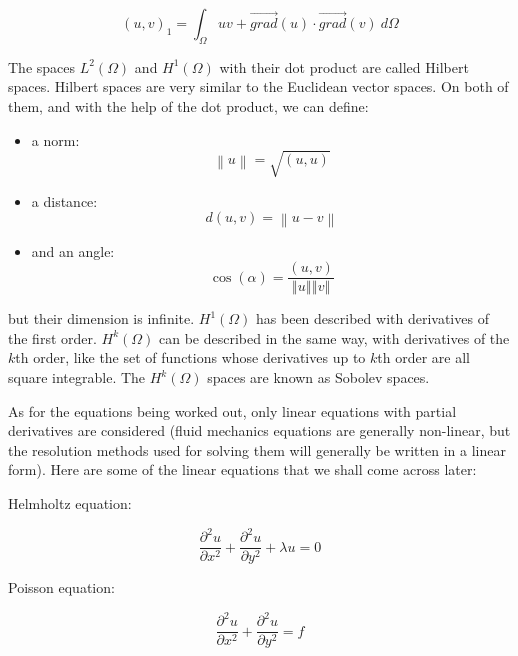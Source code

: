 \begin{equation}
(u,v)_{1}=\int_{\Omega}uv+\overrightarrow{grad}(u)\cdot\overrightarrow{grad}%
(v)~d\Omega
\end{equation}


The spaces $L^{2}(\Omega)$ and $H^{1}(\Omega)$ with their dot product are
called Hilbert%
spaces. Hilbert spaces are very similar to the Euclidean vector spaces. On
both of them, and with the help of the dot product, we can define:
\begin{itemize}
\item a norm:%
  \begin{equation}
    \left\|  u\right\|  =\sqrt{(u,u)}%
  \end{equation}
\item a distance:%
  \begin{equation}
    d(u,v)=\left\|  u-v\right\|
  \end{equation}
\item and an angle:%
  \begin{equation}
    \cos(\alpha)=\frac{(u,v)}{\left\Vert u\right\Vert \left\Vert v\right\Vert }%
  \end{equation}
\end{itemize}
but their dimension is infinite. $H^{1}(\Omega)$ has been described with
derivatives of the first order. $H^{k}(\Omega)$ can be described in the same
way, with derivatives of the $k$th order, like the set of functions whose
derivatives up to $k$th order are all square integrable. The $H^{k}(\Omega)$
spaces are known as Sobolev%
spaces.

As for the equations being worked out, only linear equations with partial
derivatives are considered (fluid mechanics equations are generally
non-linear, but the resolution methods used for solving them will generally be
written in a linear form). Here are some of the linear equations that we shall
come across later:

Helmholtz equation:%
%
%

\begin{equation}
\frac{\partial^{2}u}{\partial x^{2}}+\frac{\partial^{2}u}{\partial y^{2}%
}+\lambda u=0
\end{equation}


Poisson equation:%
%
%

\begin{equation}
\frac{\partial^{2}u}{\partial x^{2}}+\frac{\partial^{2}u}{\partial y^{2}}=f
\end{equation}


